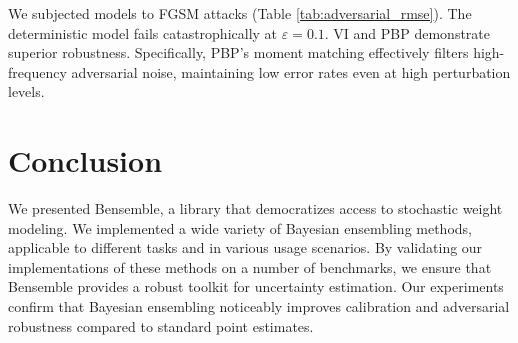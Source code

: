 \documentclass[a4paper,fleqn]{cas-dc}
\begin{document}
We subjected models to FGSM attacks (Table \ref{tab:adversarial_rmse}). The deterministic model fails catastrophically at $\varepsilon=0.1$. VI and PBP demonstrate superior robustness. Specifically, PBP's moment matching effectively filters high-frequency adversarial noise, maintaining low error rates even at high perturbation levels.

\section{Conclusion}
We presented Bensemble, a library that democratizes access to stochastic weight modeling. We implemented a wide variety of Bayesian ensembling methods, applicable to different tasks and in various usage scenarios. By validating our implementations of these methods on a number of benchmarks, we ensure that Bensemble provides a robust toolkit for uncertainty estimation. Our experiments confirm that Bayesian ensembling noticeably improves calibration and adversarial robustness compared to standard point estimates.






\end{document}
